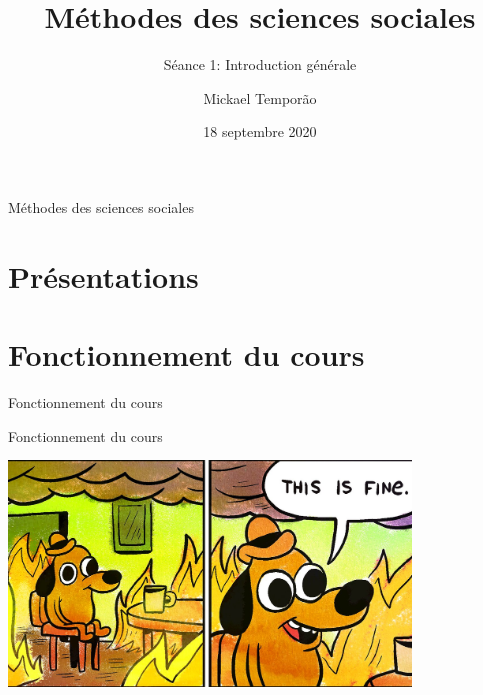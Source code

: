 \documentclass[10pt]{beamer}
\title{Méthodes des sciences sociales}
\subtitle{Séance 1: Introduction générale}
\author{Mickael Temporão}
\date{18 septembre 2020}
\begin{document}
\maketitle

\begin{frame}{Méthodes des sciences sociales}
    \vspace{24pt}
\end{frame}

\section{Présentations}
\section{Fonctionnement du cours}

\begin{frame}{Fonctionnement du cours}
\end{frame}

\begin{frame}{Fonctionnement du cours}
    \begin{center}
    \includegraphics[height=6cm, trim=0 0.5 3.7cm .5, clip]{fine.jpg}
    \end{center}
\end{frame}
\end{document}
